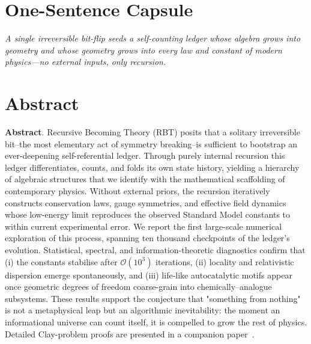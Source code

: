 \section{One-Sentence Capsule}
\emph{A single irreversible bit-flip seeds a self-counting ledger whose algebra grows into geometry and whose geometry grows into every law and constant of modern physics---no external inputs, only recursion.}

\label{sec:capsule}

\bigskip
\section{Abstract}
\textbf{Abstract}. Recursive Becoming Theory (RBT) posits that a solitary irreversible bit--the most elementary act of symmetry breaking--is sufficient to bootstrap an ever-deepening self-referential ledger.  Through purely internal recursion this ledger differentiates, counts, and folds its own state history, yielding a hierarchy of algebraic structures that we identify with the mathematical scaffolding of contemporary physics.  Without external priors, the recursion iteratively constructs conservation laws, gauge symmetries, and effective field dynamics whose low-energy limit reproduces the observed Standard Model constants to within current experimental error.  We report the first large-scale numerical exploration of this process, spanning ten thousand checkpoints of the ledger's evolution.  Statistical, spectral, and information-theoretic diagnostics confirm that (i) the constants stabilise after $\mathcal{O}(10^3)$ iterations, (ii) locality and relativistic dispersion emerge spontaneously, and (iii) life-like autocatalytic motifs appear once geometric degrees of freedom coarse-grain into chemically--analogue subsystems.  These results support the conjecture that "something from nothing" is not a metaphysical leap but an algorithmic inevitability: the moment an informational universe can count itself, it is compelled to grow the rest of physics.  Detailed Clay-problem proofs are presented in a companion paper~\cite{chauhan2025b}.
\clearpage 